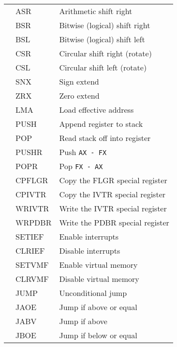 \documentclass[12pt,a4paper]{report}
\begin{document}
\begin{center}
\begin{longtable}{|>{\rownumber}l|>{\ttfamily}l|l|}
         & ASR                   & Arithmetic shift right            \\
         & BSR                   & Bitwise (logical) shift right     \\
         & BSL                   & Bitwise (logical) shift left      \\
         & CSR                   & Circular shift right (rotate)     \\
         & CSL                   & Circular shift left (rotate)      \\
         & SNX                   & Sign extend                       \\
         & ZRX                   & Zero extend                       \\
         & LMA                   & Load effective address            \\
         & PUSH                  & Append register to stack          \\
         & POP                   & Read stack off into register      \\
         & PUSHR                 & Push \texttt{AX - FX}             \\
         & POPR                  & Pop \texttt{FX - AX}              \\
         & CPFLGR                & Copy the FLGR special register    \\
         & CPIVTR                & Copy the IVTR special register    \\
         & WRIVTR                & Write the IVTR special register   \\
         & WRPDBR                & Write the PDBR special register   \\
         & SETIEF                & Enable interrupts                 \\
         & CLRIEF                & Disable interrupts                \\
         & SETVMF                & Enable virtual memory             \\
         & CLRVMF                & Disable virtual memory            \\
         & JUMP                  & Unconditional jump                \\
         & JAOE                  & Jump if above or equal            \\
         & JABV                  & Jump if above                     \\
         & JBOE                  & Jump if below or equal            \\

\end{longtable}
\end{center}
\end{document}
